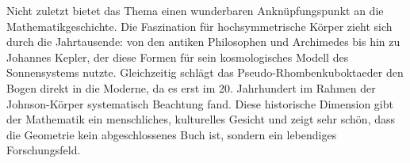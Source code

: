 Nicht zuletzt bietet das Thema einen wunderbaren Anknüpfungspunkt an die Mathematikgeschichte. Die Faszination für hochsymmetrische Körper zieht sich durch die Jahrtausende: von den antiken Philosophen und Archimedes bis hin zu Johannes Kepler, der diese Formen für sein kosmologisches Modell des Sonnensystems nutzte. Gleichzeitig schlägt das Pseudo-Rhombenkuboktaeder den Bogen direkt in die Moderne, da es erst im 20. Jahrhundert im Rahmen der Johnson-Körper systematisch Beachtung fand. Diese historische Dimension gibt der Mathematik ein menschliches, kulturelles Gesicht und zeigt sehr schön, dass die Geometrie kein abgeschlossenes Buch ist, sondern ein lebendiges Forschungsfeld.